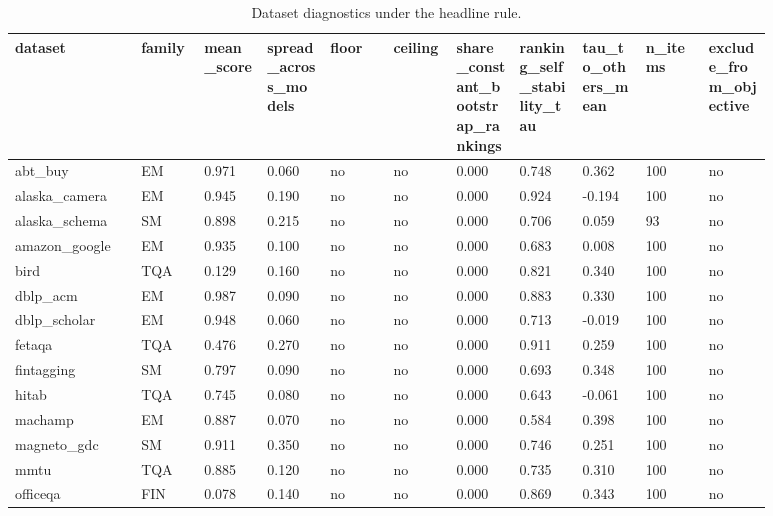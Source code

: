 \begin{landscape}
\tiny
\setlength{\tabcolsep}{3pt}
\begin{longtable}{p{0.147\linewidth}p{0.073\linewidth}p{0.073\linewidth}p{0.073\linewidth}p{0.073\linewidth}p{0.073\linewidth}p{0.073\linewidth}p{0.073\linewidth}p{0.073\linewidth}p{0.073\linewidth}p{0.073\linewidth}}
\caption{Dataset diagnostics under the headline rule.}\label{tab:diagnostics}\\
\toprule
dataset & family & mean\_\allowbreak{}score & spread\_\allowbreak{}across\_\allowbreak{}models & floor & ceiling & share\_\allowbreak{}constant\_\allowbreak{}bootstrap\_\allowbreak{}rankings & ranking\_\allowbreak{}self\_\allowbreak{}stability\_\allowbreak{}tau & tau\_\allowbreak{}to\_\allowbreak{}others\_\allowbreak{}mean & n\_\allowbreak{}items & exclude\_\allowbreak{}from\_\allowbreak{}objective \\
\midrule
abt\_\allowbreak{}buy & EM & 0.971 & 0.060 & no & no & 0.000 & 0.748 & 0.362 & 100 & no \\
alaska\_\allowbreak{}camera & EM & 0.945 & 0.190 & no & no & 0.000 & 0.924 & -0.194 & 100 & no \\
alaska\_\allowbreak{}schema & SM & 0.898 & 0.215 & no & no & 0.000 & 0.706 & 0.059 & 93 & no \\
amazon\_\allowbreak{}google & EM & 0.935 & 0.100 & no & no & 0.000 & 0.683 & 0.008 & 100 & no \\
bird & TQA & 0.129 & 0.160 & no & no & 0.000 & 0.821 & 0.340 & 100 & no \\
dblp\_\allowbreak{}acm & EM & 0.987 & 0.090 & no & no & 0.000 & 0.883 & 0.330 & 100 & no \\
dblp\_\allowbreak{}scholar & EM & 0.948 & 0.060 & no & no & 0.000 & 0.713 & -0.019 & 100 & no \\
fetaqa & TQA & 0.476 & 0.270 & no & no & 0.000 & 0.911 & 0.259 & 100 & no \\
fintagging & SM & 0.797 & 0.090 & no & no & 0.000 & 0.693 & 0.348 & 100 & no \\
hitab & TQA & 0.745 & 0.080 & no & no & 0.000 & 0.643 & -0.061 & 100 & no \\
machamp & EM & 0.887 & 0.070 & no & no & 0.000 & 0.584 & 0.398 & 100 & no \\
magneto\_\allowbreak{}gdc & SM & 0.911 & 0.350 & no & no & 0.000 & 0.746 & 0.251 & 100 & no \\
mmtu & TQA & 0.885 & 0.120 & no & no & 0.000 & 0.735 & 0.310 & 100 & no \\
officeqa & FIN & 0.078 & 0.140 & no & no & 0.000 & 0.869 & 0.343 & 100 & no \\

\end{longtable}
\end{landscape}
